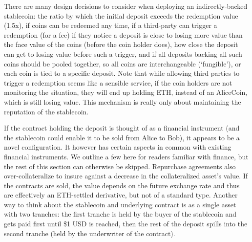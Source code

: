 There are many design decisions to consider when deploying an indirectly-backed stablecoin: the ratio by which the initial deposit exceeds the redemption value (\eg 1.5x), if coins can be redeemed any time, if a third-party can trigger a redemption (\eg for a fee) if they notice a deposit is close to losing more value than the face value of the coins (before the coin holder does), how close the deposit can get to losing value before such a trigger, and if all deposits backing all such coins should be pooled together, so all coins are interchangeable (`fungible'), or each coin is tied to a specific deposit. Note that while allowing third parties to trigger a redemption seems like a sensible service, if the coin holders are not monitoring the situation, they will end up holding ETH, instead of an AliceCoin, which is still losing value. This mechanism is really only about maintaining the reputation of the stablecoin.

If the contract holding the deposit is thought of as a financial instrument (and the stablecoin could enable it to be sold from Alice to Bob), it appears to be a novel configuration. It however has certain aspects in common with existing financial instruments. We outline a few here for readers familiar with finance, but the rest of this section can otherwise be skipped. Repurchase agreements also over-collateralize to insure against a decrease in the collateralized asset's value. If the contracts are sold, the value depends on the future exchange rate and thus are effectively an ETH-settled derivative, but not of a standard type. Another way to think about the stablecoin and underlying contract is as a single asset with two tranches: the first tranche is held by the buyer of the stablecoin and gets paid first until \$1 USD is reached, then the rest of the deposit spills into the second tranche (held by the underwriter of the contract). 



